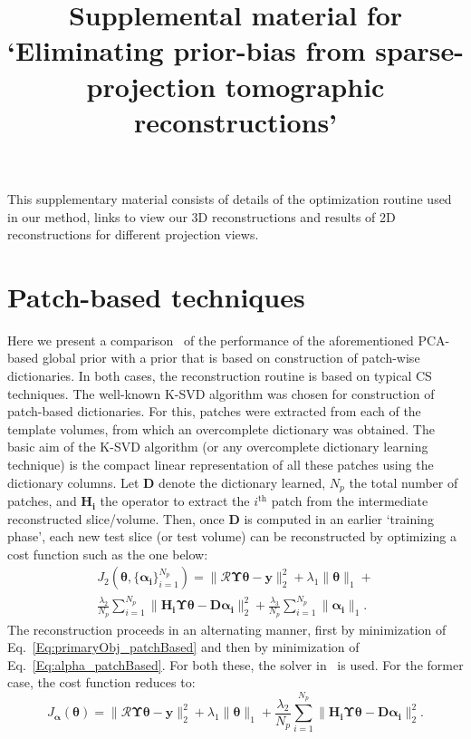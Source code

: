 \documentclass{article}
\title{Supplemental material for `Eliminating prior-bias from sparse-projection
tomographic reconstructions'}
\begin{document}
\maketitle
This supplementary material consists of details of the optimization routine used in our method, links to view our 3D reconstructions and results of 2D reconstructions for different projection views.

\tableofcontents
\newpage
\section{\textbf{Patch-based techniques}}
\label{sec:patch_based}
Here we present a comparison~\cite{my_dicta_paper} of the performance of the aforementioned PCA-based global prior with a prior that is based on construction of patch-wise dictionaries. In both cases, the reconstruction routine is based on typical CS techniques. The well-known K-SVD algorithm \cite{Aharon2006} was chosen for construction of patch-based dictionaries. For this, patches were extracted from each of the template volumes, from which an overcomplete dictionary was obtained. The basic aim of the K-SVD algorithm (or any overcomplete dictionary learning technique) is the compact linear representation of all these patches using the dictionary columns. Let $\boldsymbol{D}$ denote the dictionary learned, $N_p$ the total number of patches, and $\boldsymbol{H_i}$ the operator to extract the $i^{\textrm{th}}$ patch from the intermediate reconstructed slice/volume. Then, once $\boldsymbol{D}$ is computed in an earlier `training phase', each new test slice (or test volume) can be reconstructed by optimizing a cost function such as the one below:
\begin{multline}
J_2(\boldsymbol{\theta},\{\boldsymbol{\alpha_i}\}_{i=1}^{N_p}) = \lVert\boldsymbol{\mathcal{R}\Upsilon\theta}- \boldsymbol{y}\rVert_2^2  + \lambda_1\lVert\boldsymbol{\theta}\rVert_1 + \\ \frac{\lambda_2}{N_p}\sum_{i=1}^{N_p}\lVert \boldsymbol{H_i\Upsilon \theta}-\boldsymbol{D \alpha_i}\rVert_2^2 +\frac{\lambda_3}{ N_p}\sum_{i=1}^{N_p}\lVert\boldsymbol{\alpha_i}\rVert_1.
\label{Eq:main_patchBased}
\end{multline}
The reconstruction proceeds in an alternating manner, first by minimization of Eq.~\ref{Eq:primaryObj_patchBased} and then by minimization of Eq.~\ref{Eq:alpha_patchBased}. For both these, the solver in~\cite{l1ls} is used. For the former case, the cost function reduces to:
\begin{equation}
J_{\boldsymbol{\alpha}}(\boldsymbol{\theta}) = \lVert \boldsymbol{\mathcal{R} \Upsilon \theta}- \boldsymbol{y}\rVert_2^2  + \lambda_1\lVert\boldsymbol{\theta}\rVert_1 + \frac{\lambda_2}{N_p}\sum_{i=1}^{N_p}\rVert \boldsymbol{H_i \Upsilon \theta}-\boldsymbol{D \alpha_i}\rVert_2^2.
\label{Eq:primaryObj_patchBased}
\end{equation}
\end{document}
